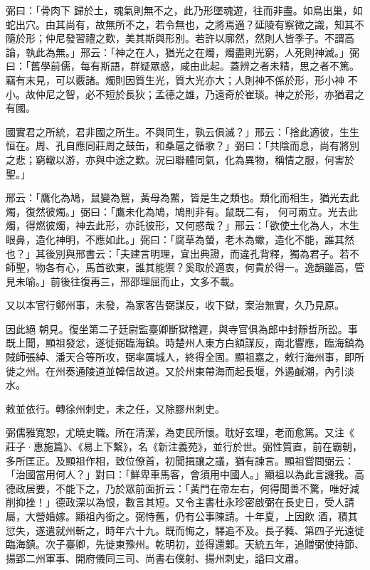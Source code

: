 \begin{pinyinscope}
 弼曰：「骨肉下
 歸於土，魂氣則無不之，此乃形墜魂遊，往而非盡。如鳥出巢，如蛇出穴。由其尚有，故無所不之，若令無也，之將焉適？延陵有察微之識，知其不隨於形；仲尼發習禮之歎，美其斯與形別。若許以廓然，然則人皆季子。不謂高論，執此為無。」邢云：「神之在人，猶光之在燭，燭盡則光窮，人死則神滅。」弼曰：「舊學前儒，每有斯語，群疑眾惑，咸由此起。蓋辨之者未精，思之者不篤。竊有末見，可以覈諸。燭則因質生光，質大光亦大；人則神不係於形，形小神
 不小。故仲尼之智，必不短於長狄；孟德之雄，乃遠奇於崔琰。神之於形，亦猶君之有國。



 國實君之所統，君非國之所生。不與同生，孰云俱滅？」邢云：「捨此適彼，生生恒在。周、孔自應同莊周之鼓缶，和桑扈之循歌？」弼曰：「共陰而息，尚有將別之悲；窮轍以游，亦與中途之歎。況曰聯體同氣，化為異物，稱情之服，何害於聖。」



 邢云：「鷹化為鳩，鼠變為鴽，黃母為鱉，皆是生之類也。類化而相生，猶光去此燭，復然彼燭。」弼曰：「鷹未化為鳩，鳩則非有。鼠既二有，
 何可兩立。光去此燭，得燃彼燭，神去此形，亦託彼形，又何惑哉？」邢云：「欲使土化為人，木生眼鼻，造化神明，不應如此。」弼曰：「腐草為螢，老木為蠍，造化不能，誰其然也？」其後別與邢書云：「夫建言明理，宜出典證，而違孔背釋，獨為君子。若不師聖，物各有心，馬首欲東，誰其能禦？奚取於適衷，何貴於得一。逸韻雖高，管見未喻。」前後往復再三，邢邵理屈而止，文多不載。



 又以本官行鄭州事，未發，為家客告弼謀反，收下獄，案治無實，久乃見原。



 因此絕
 朝見。復坐第二子廷尉監臺卿斷獄稽遲，與寺官俱為郎中封靜哲所訟。事既上聞，顯祖發忿，遂徙弼臨海鎮。時楚州人東方白額謀反，南北響應，臨海鎮為賊師張綽、潘天合等所攻，弼率厲城人，終得全固。顯祖嘉之，敕行海州事，即所徙之州。在州奏通陵道並韓信故道。又於州東帶海而起長堰，外遏鹹潮，內引淡水。



 敕並依行。轉徐州刺史，未之任，又除膠州刺史。



 弼儒雅寬恕，尤曉史職。所在清潔，為吏民所懷。耽好玄理，老而愈篤。又注《
 莊子·惠施篇》、《易上下繫》，名《新注義苑》，並行於世。弼性質直，前在霸朝，多所匡正。及顯祖作相，致位僚首，初聞揖讓之議，猶有諫言。顯祖嘗問弼云：「治國當用何人？」對曰：「鮮卑車馬客，會須用中國人。」顯祖以為此言譏我。高德政居要，不能下之，乃於眾前面折云：「黃門在帝左右，何得聞善不驚，唯好減削抑挫！」德政深以為恨，數言其短。又令主書杜永珍密啟弼在長史日，受人請屬，大營婚嫁。顯祖內銜之。弼恃舊，仍有公事陳請。十年夏，上因飲
 酒，積其愆失，遂遣就州斬之，時年六十九。既而悔之，驛追不及。長子蕤、第四子光遠徙臨海鎮。次子臺卿，先徙東豫州。乾明初，並得還鄴。天統五年，追贈弼使持節、揚郢二州軍事、開府儀同三司、尚書右僕射、揚州刺史，謚曰文肅。




\end{pinyinscope}
